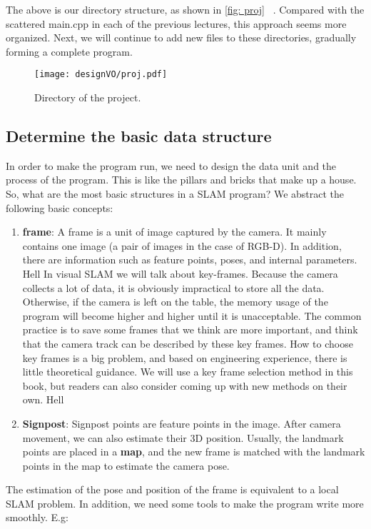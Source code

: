 The above is our directory structure, as shown in \autoref{fig: proj} ~. Compared with the scattered main.cpp in each of the previous lectures, this approach seems more organized. Next, we will continue to add new files to these directories, gradually forming a complete program.

\begin{figure}[!htp]
\centering
\texttt{[image: designVO/proj.pdf]}
\caption{Directory of the project. }
\label{fig: proj}
\end{figure}

\subsection{Determine the basic data structure}
In order to make the program run, we need to design the data unit and the process of the program. This is like the pillars and bricks that make up a house. So, what are the most basic structures in a SLAM program? We abstract the following basic concepts:

\begin{enumerate}
\item \textbf{frame}: A frame is a unit of image captured by the camera. It mainly contains one image (a pair of images in the case of RGB-D). In addition, there are information such as feature points, poses, and internal parameters.
Hell
In visual SLAM we will talk about key-frames. Because the camera collects a lot of data, it is obviously impractical to store all the data. Otherwise, if the camera is left on the table, the memory usage of the program will become higher and higher until it is unacceptable. The common practice is to save some frames that we think are more important, and think that the camera track can be described by these key frames. How to choose key frames is a big problem, and based on engineering experience, there is little theoretical guidance. We will use a key frame selection method in this book, but readers can also consider coming up with new methods on their own.
Hell
\item \textbf{Signpost}: Signpost points are feature points in the image. After camera movement, we can also estimate their 3D position. Usually, the landmark points are placed in a \textbf{map}, and the new frame is matched with the landmark points in the map to estimate the camera pose.
\end{enumerate}

\clearpage
The estimation of the pose and position of the frame is equivalent to a local SLAM problem. In addition, we need some tools to make the program write more smoothly. E.g:

